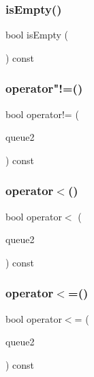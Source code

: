 \subsubsection{\texorpdfstring{is\+Empty()}{isEmpty()}}
{\footnotesize\ttfamily bool is\+Empty (\begin{DoxyParamCaption}{ }\end{DoxyParamCaption}) const}

\mbox{\label{classQueue_a385dafd253f98c0a2cec02b5c077cc2e}} 
\subsubsection{\texorpdfstring{operator"!=()}{operator!=()}}
{\footnotesize\ttfamily bool operator!= (\begin{DoxyParamCaption}\item[{const \mbox{\hyperlink{classQueue}{Queue}}$<$ Value\+Type $>$ \&}]{queue2 }\end{DoxyParamCaption}) const}

\mbox{\label{classQueue_ad2043e6acdbba5a438b040a2ceda3db7}} 
\subsubsection{\texorpdfstring{operator$<$()}{operator<()}}
{\footnotesize\ttfamily bool operator$<$ (\begin{DoxyParamCaption}\item[{const \mbox{\hyperlink{classQueue}{Queue}}$<$ Value\+Type $>$ \&}]{queue2 }\end{DoxyParamCaption}) const}

\mbox{\label{classQueue_aea83f9b16703e7b7a1e46e0746f608c0}} 
\subsubsection{\texorpdfstring{operator$<$=()}{operator<=()}}
{\footnotesize\ttfamily bool operator$<$= (\begin{DoxyParamCaption}\item[{const \mbox{\hyperlink{classQueue}{Queue}}$<$ Value\+Type $>$ \&}]{queue2 }\end{DoxyParamCaption}) const}

